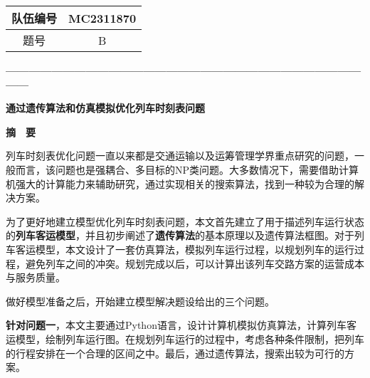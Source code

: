 \thispagestyle{empty}   %


\begin{table}[h]
    \centering
    \begin{tabular}{|c|c|}
    \hline
    队伍编号 & MC2311870 \\ \hline
    题号   & B         \\ \hline
    \end{tabular}
\end{table}



\begin{center}
    \textbf{—————————————————————————————————}

    \textbf{\fontsize{20}{1.5}通过遗传算法和仿真模拟优化列车时刻表问题}

    \textbf{摘　要}
\end{center}





%
%

列车时刻表优化问题一直以来都是交通运输以及运筹管理学界重点研究的问题，一般而言，该问题也是强耦合、多目标的NP类问题。大多数情况下，需要借助计算机强大的计算能力来辅助研究，通过实现相关的搜索算法，找到一种较为合理的解决方案\cite{niuGuidaoliecheshikebiaowentiyanjiuzongshu2021}。

为了更好地建立模型优化列车时刻表问题，本文首先建立了用于描述列车运行状态的\textbf{列车客运模型}，并且初步阐述了\textbf{遗传算法}的基本原理以及遗传算法框图。对于列车客运模型，本文设计了一套仿真算法，模拟列车运行过程，以规划列车的运行过程，避免列车之间的冲突。规划完成以后，可以计算出该列车交路方案的运营成本与服务质量。

做好模型准备之后，开始建立模型解决题设给出的三个问题。

\textbf{针对问题一}，本文主要通过Python语言，设计计算机模拟仿真算法，计算列车客运模型，绘制列车运行图。在规划列车运行的过程中，考虑各种条件限制，把列车的行程安排在一个合理的区间之中。最后，通过遗传算法，搜索出较为可行的方案。

